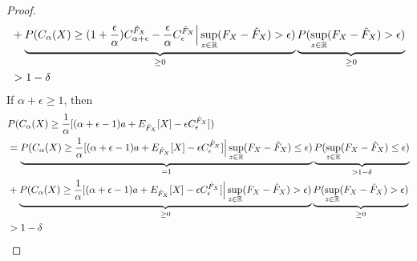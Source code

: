 \documentclass[acmlarge, manuscript, screen, review, natbib=false, oneside]{acmart}
\begin{document}
\begin{proof}
\begin{equation}
\begin{aligned}
			&+\underbrace{P(C_\alpha(X)\geq (1+\frac{\epsilon}{\alpha})C_{\alpha+\epsilon}^{\hat{F}_X}-\frac{\epsilon}{\alpha}C_{\epsilon}^{\hat{F}_X}\Bigr{|} \sup_{z\in\mathbb{R}}(F_X-\hat{F}_X) > \epsilon)}_{\geq 0} 
			\underbrace{P(\sup_{z\in\mathbb{R}}(F_X-\hat{F}_X) > \epsilon)}_{\geq 0} \\
			&> 1-\delta
		\end{aligned}
	\end{equation}
	If $\alpha+\epsilon \geq 1$, then \begin{equation}
		\begin{aligned}
			&P(C_\alpha(X) \geq \frac{1}{\alpha}[(\alpha+\epsilon - 1)a + E_{\hat{F}_X}[X] - \epsilon C_\epsilon^{\hat{F}_X}]) \\
			&=\underbrace{P(C_\alpha(X) \geq \frac{1}{\alpha}[(\alpha+\epsilon - 1)a + E_{\hat{F}_X}[X] - \epsilon C_\epsilon^{\hat{F}_X}]\Bigr{|} \sup_{z\in\mathbb{R}}(F_X-\hat{F}_X)\leq \epsilon)}_{=1} 
			\underbrace{P(\sup_{z\in\mathbb{R}}(F_X-\hat{F}_X) \leq \epsilon)}_{>1-\delta} \\
			&+\underbrace{P(C_\alpha(X) \geq \frac{1}{\alpha}[(\alpha+\epsilon - 1)a + E_{\hat{F}_X}[X] - \epsilon C_\epsilon^{\hat{F}_X}]\Bigr{|} \sup_{z\in\mathbb{R}}(F_X-\hat{F}_X) > \epsilon)}_{\geq 0} 
			\underbrace{P(\sup_{z\in\mathbb{R}}(F_X-\hat{F}_X) > \epsilon)}_{\geq 0} \\
			&> 1-\delta
		\end{aligned}
	\end{equation}
\end{proof}
\end{document}

